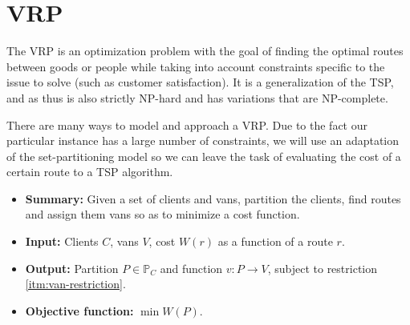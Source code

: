 \pagebreak
\section{\texorpdfstring{\Acrlong*{VRP}}{Vehicle routing problem}} \label{algorithm-vrp}
The \acrfull*{VRP} is an optimization problem with the goal of finding the optimal routes between goods or people while taking into account constraints specific to the issue to solve (such as customer satisfaction). It is a generalization of the \acrshort{TSP}, and as thus is also strictly NP-hard and has variations that are NP-complete.\par
There are many ways to model and approach a \acrshort{VRP}. Due to the fact our particular instance has a large number of constraints, we will use an adaptation of the set-partitioning model \cite[p.~21-22]{optimal-vrp} so we can leave the task of evaluating the cost of a certain route to a \acrshort{TSP} algorithm.\par

\begin{itemize}
    \item \textbf{Summary:} Given a set of clients and vans, partition the clients, find routes and assign them vans so as to minimize a cost function.
    \item \textbf{Input:} Clients $C$, vans $V$, cost $W(r)$ as a function of a route $r$.
    \item \textbf{Output:} Partition $P \in \mathbb{P}_C$ and function $v\colon P \rightarrow V$, subject to restriction \ref{itm:van-restriction}.
    \item \textbf{Objective function:} $\min W(P)$.
\end{itemize}




